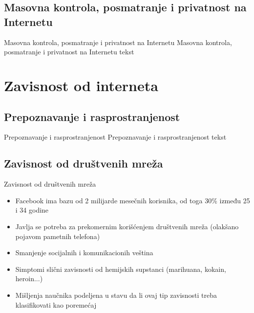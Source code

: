 \documentclass{beamer}
\begin{document}
		\subsection*{Masovna kontrola, posmatranje i privatnost na Internetu}
			\begin{frame}{Masovna kontrola, posmatranje i privatnost na Internetu}
				Masovna kontrola, posmatranje i privatnost na Internetu tekst
			\end{frame}
		
	\section{Zavisnost od interneta}
		\subsection*{Prepoznavanje i rasprostranjenost}
		\begin{frame}{Prepoznavanje i rasprostranjenost}
				Prepoznavanje i rasprostranjenost tekst
		\end{frame}
	
		\subsection*{Zavisnost od društvenih mreža}
			\begin{frame}{Zavisnost od društvenih mreža}
				\begin{itemize}
				\item Facebook ima bazu od 2 milijarde mesečnih korisnika, od toga 30\% između 25 i 34 godine
				\item Javlja se potreba za prekomernim korišćenjem društvenih mreža (olakšano pojavom pametnih telefona)
				\item Smanjenje socijalnih i komunikacionih veština
				\item Simptomi slični zavisnosti od hemijskih supstanci (marihuana, kokain, heroin...)
				\item Mišljenja naučnika podeljena u stavu da li ovaj tip zavisnosti treba klasifikovati kao poremećaj
				\end{itemize}
			\end{frame}
\end{document}

